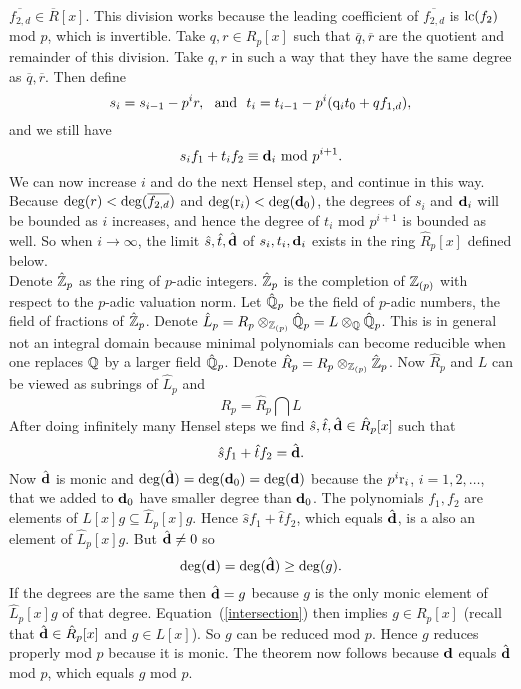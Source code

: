 \documentclass[10pt]{article}
\newcommand{\Q}{\QQ}
\newcommand{\sQ}{\QQ}
\newcommand{\Z}{\ZZ}
\begin{document}
$\overline{f_{2,d}} \in \overline{R}[x]$. This division works because the
leading coefficient of $\overline{f_{2,d}}$ is ${\rm lc}(f_2)$ mod $p$,
which is invertible.
Take $q,r \in R_p[x]$ such that $\overline{q},\overline{r}$ are the
quotient and remainder of this division. Take $q,r$ in such a way that
they have the same degree as $\overline{q},\overline{r}$.
Then define
\[
	s_i = s_{i-1} - p^i r, {\rm \ \ and \ \ }
	t_i = t_{i-1} - p^i({\bf \rm q}_i t_0 + q f_{1,d}),
\]
and we still have
\[
	s_i f_1 + t_i f_2 \equiv {\bf d}_i {\rm \ mod \ } p^{i+1}.
\]
We can now increase $i$ and do the next Hensel step, and continue in
this way.
Because ${\rm deg}(r) < {\rm deg}(\overline{f_{2,d}})$
and ${\rm deg}({\bf \rm r}_i) < {\rm deg}({\bf d}_0)$, the degrees
of $s_i$ and ${\bf d}_i$ will be bounded as $i$ increases, and hence the
degree of $t_i$ mod $p^{i+1}$ is bounded as well.
So when $i \rightarrow \infty$,  the limit $\hat{s},\hat{t},\hat{\bf d}$
of $s_i,t_i,{\bf d}_i$ exists in the ring $\hat{R}_p[x]$ defined
below. \\
Denote $\hat{\Z}_p$ as the ring of $p$-adic integers. $\hat{\Z}_p$ is
the completion of $\Z_{(p)}$ with respect to the $p$-adic valuation norm.
Let $\hat{\Q}_p$ be the field of $p$-adic numbers, the field of fractions
of $\hat{\Z}_p$.
Denote $\hat{L}_p = R_p \otimes_{\Z_{(p)}} \hat{\Q}_p = L \otimes_{\sQ} \hat{\Q}_p$.
This is in general not an integral domain because minimal polynomials can become
reducible when one replaces $\Q$ by a larger field $\hat{\Q}_p$.
Denote $\hat{R}_p =   R_p \otimes_{\Z_{(p)}} \hat{\Z}_p$.
Now $\hat{R}_p$ and $L$ can be viewed as subrings of $\hat{L}_p$
and
\begin{equation}
	\label{intersection}
	R_p = \hat{R}_p \bigcap L
\end{equation}
After doing infinitely many Hensel steps we find
$\hat{s},\hat{t},\hat{\bf d} \in \hat{R}_p[x]$ such that
\[ \hat{s}f_1 + \hat{t}f_2 = \hat{\bf d}. \]
Now $\hat{\bf d}$ is monic and
$ {\rm deg}(\hat{\bf d}) = {\rm deg}({\bf d}_0) = {\rm deg}({\bf d}) $
because the $p^i {\bf \rm r}_i$, $i=1,2,\ldots$, that we added to ${\bf d}_0$
have smaller degree than ${\bf d}_0$.
The polynomials $f_1,f_2$ are elements of $L[x]g \subseteq \hat{L}_p[x]g$.
Hence $\hat{s}f_1 + \hat{t}f_2$, which equals $\hat{\bf d}$, is a also
an element of $\hat{L}_p[x]g$.
But $\hat{\bf d} \neq 0$ so
\[	  {\rm deg}({\bf d})
	= {\rm deg}(\hat{\bf d}) \geq {\rm deg}(g).
\]
If the degrees are the same then $\hat{\bf d} = g$
because $g$ is the only monic element of $\hat{L}_p[x]g$
of that degree.
Equation~(\ref{intersection}) then implies $g \in R_p[x]$
(recall that $\hat{\bf d} \in \hat{R}_p[x]$ and $g \in L[x]$).
So $g$ can be reduced mod $p$. Hence $g$ reduces properly
mod $p$ because it is monic.
The theorem now follows because ${\bf d}$ equals $\hat{\bf d}$ mod $p$,
which equals $g$ mod $p$.
\end{document}
